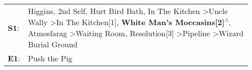 \begin{supertabular}{p{0.03\textwidth}p{0.92\textwidth}}
 \textbf{S1}:  &  Higgins\textsuperscript{}, \enspace 2nd Self\textsuperscript{}, \enspace Hurt Bird Bath\textsuperscript{}, \enspace In The Kitchen\textsuperscript{} \textgreater \enspace Uncle Wally\textsuperscript{} \textgreater \enspace In The Kitchen[1]\textsuperscript{}, \enspace \textbf{White Man's Moccasins[2]\textsuperscript{$\wedge$}}, \enspace Atmosfarag\textsuperscript{} \textgreater \enspace Waiting Room\textsuperscript{}, \enspace Resolution[3]\textsuperscript{} \textgreater \enspace Pipeline\textsuperscript{} \textgreater \enspace Wizard Burial Ground\textsuperscript{}  \enspace  \\
 \textbf{E1}:  &                                                                                                                                                                                                                                                                                                                                                                                                                                                                                                                                                                Push the Pig\textsuperscript{}  \enspace  \\
\end{supertabular}
